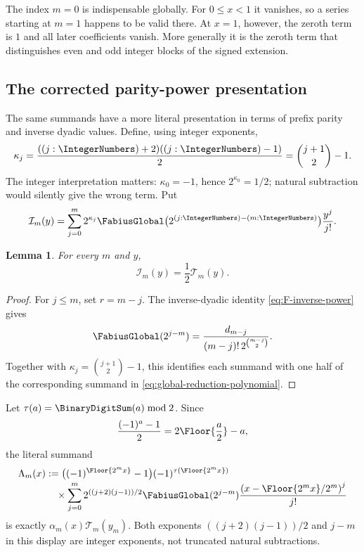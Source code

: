 \documentclass[11pt,oneside]{article}
\newtheorem{lemma}[theorem]{Lemma}
\theoremstyle{definition}
\theoremstyle{remark}
\begin{document}
The index $m=0$ is indispensable globally.  For $0\le x<1$ it vanishes, so a series
starting at $m=1$ happens to be valid there.  At $x=1$, however, the zeroth term is $1$ and
all later coefficients vanish.  More generally it is the zeroth term that distinguishes
even and odd integer blocks of the signed extension.

\subsection{The corrected parity-power presentation}
\label{subsec:corrected-parity-power}

The same summands have a more literal presentation in terms of prefix parity and inverse
dyadic values.  Define, using integer exponents,
\begin{equation}
 \kappa_j=\frac{((j:\IntegerNumbers)+2)((j:\IntegerNumbers)-1)}2
 =\binom{j+1}{2}-1.                                      \label{eq:parity-power-integer-exponent}
\end{equation}
The integer interpretation matters: $\kappa_0=-1$, hence $2^{\kappa_0}=1/2$; natural
subtraction would silently give the wrong term.  Put
\begin{equation}
 \mathcal I_m(y)=\sum_{j=0}^{m}
 2^{\kappa_j}\FabiusGlobal\bigl(2^{(j:\IntegerNumbers)-(m:\IntegerNumbers)}\bigr)
 \frac{y^j}{j!}.                                         \label{eq:parity-power-inner}
\end{equation}

\begin{lemma}
For every $m$ and $y$,
\begin{equation}
 \mathcal I_m(y)=\frac12\mathcal T_m(y).                 \label{eq:parity-power-half-reduction}
\end{equation}
\end{lemma}

\begin{proof}
For $j\le m$, set $r=m-j$.  The inverse-dyadic identity
\eqref{eq:F-inverse-power} gives
\begin{equation*}
 \FabiusGlobal(2^{j-m})=
 \frac{d_{m-j}}{(m-j)!\,2^{\binom{m-j}{2}}}.
\end{equation*}
Together with $\kappa_j=\binom{j+1}{2}-1$, this identifies each summand with one half of
the corresponding summand in \eqref{eq:global-reduction-polynomial}.
\end{proof}

Let $\tau(a)=\BinaryDigitSum(a)\bmod2$.  Since
\begin{equation*}
 \frac{(-1)^a-1}{2}=2\Floor{\frac a2}-a,
\end{equation*}
the literal summand
\begin{align}
 \Lambda_m(x)
 &:=
 \bigl((-1)^{\Floor{2^mx}}-1\bigr)
 (-1)^{\tau(\Floor{2^mx})}                               \notag\\[-2pt]
 &\quad\times
 \sum_{j=0}^{m}2^{((j+2)(j-1))/2}
 \FabiusGlobal(2^{j-m})
 \frac{\left(x-\Floor{2^mx}/2^m\right)^j}{j!}           \label{eq:parity-power-literal-summand}
\end{align}
is exactly $\alpha_m(x)\mathcal T_m(y_m)$.  Both exponents
$((j+2)(j-1))/2$ and $j-m$ in this display are integer exponents, not truncated natural
subtractions.
\end{document}
